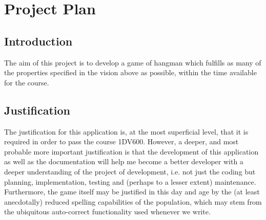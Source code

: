\documentclass[12pt, letterpaper]{article}
\begin{document}
\newpage 
\section{Project Plan}
\subsection{Introduction}
The aim of this project is to develop a game of hangman which fulfills as many of the properties specified in the vision above as possible, within the time available for the course.
\subsection{Justification}
The justification for this application is, at the most superficial level, that it is required in order to pass the course 1DV600. However, a deeper, and most probable more important justification is that the development of this application as well as the documentation will help me become a better developer with a deeper understanding of the project of development, i.e. not just the coding but planning, implementation, testing and (perhaps to a lesser extent) maintenance. Furthermore, the game itself may be justified in this day and age by the (at least anecdotally) reduced spelling capabilities of the population, which may stem from the ubiquitous auto-correct functionality used whenever we write. 
\end{document}
